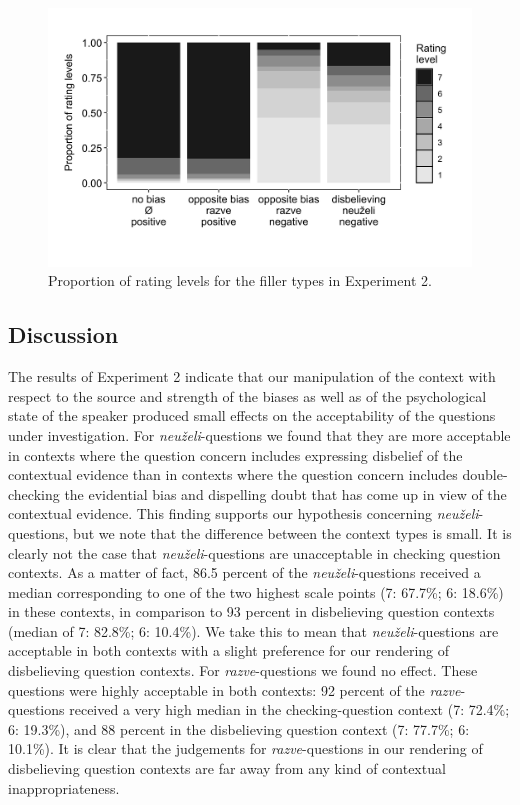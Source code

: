 \documentclass[output=paper,colorlinks,citecolor=brown]{langscibook}
\begin{document}
\begin{figure} 
\includegraphics[height=.3\textheight]{figures/ch11-4.png}
\caption{Proportion of rating levels for the filler types in \newline
Experiment 2.} \label{fig:4}
\end{figure}

\subsection{Discussion}\label{sec:05:5:3}

The results of Experiment 2 indicate that our manipulation of the context with respect to the source and strength of the biases as well as of the psychological state of the speaker produced small effects on the acceptability of the questions under investigation. For \textit{neuželi}-questions we found that they are more acceptable in contexts where the question concern includes expressing disbelief of the contextual evidence than in contexts where the question concern includes double-checking the evidential bias and dispelling doubt that has come up in view of the contextual evidence. This finding supports our hypothesis concerning \textit{neuželi}-questions, but we note that the difference between the context types is small. It is clearly not the case that \textit{neuželi}-questions are unacceptable in checking question contexts. As a matter of fact, 86.5 percent of the \textit{neuželi}-questions received a median corresponding to one of the two highest scale points (7: 67.7\%; 6: 18.6\%) in these contexts, in comparison to 93 percent in disbelieving question contexts (median of 7: 82.8\%; 6: 10.4\%). We take this to mean that \textit{neuželi}-questions are acceptable in both contexts with a slight preference for our rendering of disbelieving question contexts. For \textit{razve}-questions we found no effect. These questions were highly acceptable in both contexts: 92 percent of the \textit{razve}-questions received a very high median in the checking-question context (7: 72.4\%; 6: 19.3\%), and 88 percent in the disbelieving question context (7: 77.7\%; 6: 10.1\%). It is clear that the judgements for \textit{razve}-questions in our rendering of disbelieving question contexts are far away from any kind of contextual inappropriateness.
\end{document}
